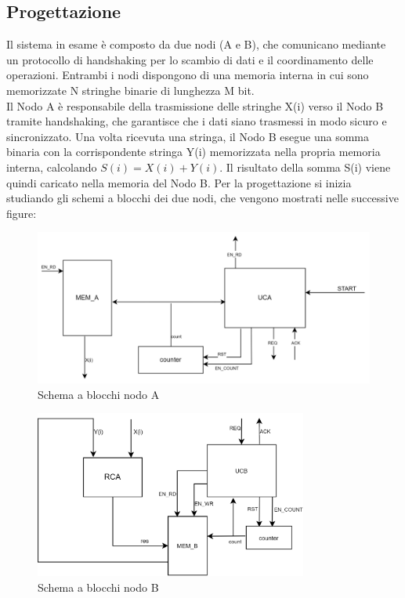 \subsection{Progettazione}
Il sistema in esame è composto da due nodi (A e B), che comunicano mediante un protocollo di handshaking per lo scambio di dati e il coordinamento delle operazioni. Entrambi i nodi dispongono di una memoria interna in cui sono memorizzate N stringhe binarie di lunghezza M bit. \\
Il Nodo A è responsabile della trasmissione delle stringhe
X(i) verso il Nodo B tramite handshaking, che garantisce che i dati siano trasmessi in modo sicuro e sincronizzato. Una volta ricevuta una stringa, il Nodo B esegue una somma binaria con la corrispondente stringa Y(i) memorizzata nella propria memoria interna, calcolando 
$S(i)=X(i)+Y(i)$.
Il risultato della somma S(i) viene quindi caricato nella memoria del Nodo B.
Per la progettazione si inizia studiando gli schemi a blocchi dei due nodi, che vengono mostrati nelle successive figure:
\begin{figure}[H]
	\centering
	\includegraphics[width=1\textwidth]{img/handshaking/sch_nodoA_Handshaking}
	\caption{Schema a blocchi nodo A}
	\label{test1} 
\end{figure}
\begin{figure}[H]
	\centering
	\includegraphics[width=0.8\textwidth]{img/handshaking/sch_nodoB_Handshaking}
	\caption{Schema a blocchi nodo B}
	\label{test1} 
\end{figure}

